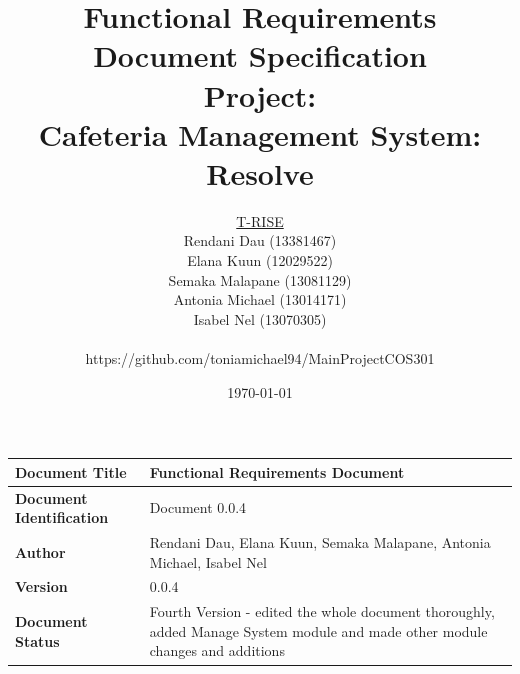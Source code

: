 \documentclass[a4paper,12pt]{article}
\begin{document}
\title{\Huge Functional Requirements Document Specification \\ 
	 Project: \\ 
	Cafeteria Management System: Resolve}
\author{
         \underline{T-RISE}\\
          Rendani Dau (13381467) \\
	Elana Kuun (12029522) \\
	Semaka Malapane (13081129) \\
	Antonia Michael (13014171) \\
	Isabel Nel (13070305)\\ \\
	https://github.com/toniamichael94/MainProjectCOS301}

\date{\today}
 


\maketitle
\break

\tableofcontents
\break

\begin{tabu} to 0.8\textwidth { | X[l] | X[l] | }
 \hline
\textbf{Document Title} & Functional Requirements Document \\
 \hline
 \textbf{Document Identification}  & Document 0.0.4 \\
\hline
 \textbf{Author}  & Rendani Dau, Elana Kuun, Semaka Malapane, Antonia Michael, Isabel Nel \\
\hline
\textbf{Version} & 0.0.4 \\
\hline
\textbf{Document Status} & Fourth Version - edited the whole document thoroughly, added Manage System module and made other module changes and additions \\
\hline
\end{tabu}
\end{document}
